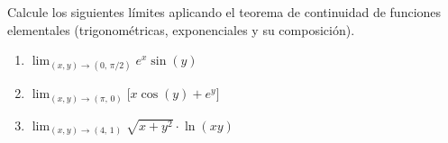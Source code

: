 Calcule los siguientes límites aplicando el teorema de continuidad de funciones elementales (trigonométricas, exponenciales y su composición).
\begin{enumerate}
    \item $\displaystyle\lim_{(x,y) \to (0,\,\pi/2)} e^{x}\sin(y)$
    \item $\displaystyle\lim_{(x,y) \to (\pi,\,0)} \bigl[x\cos(y) + e^{y}\bigr]$
    \item $\displaystyle\lim_{(x,y) \to (4,\,1)} \sqrt{x + y^2}\cdot\ln(xy)$
\end{enumerate}
